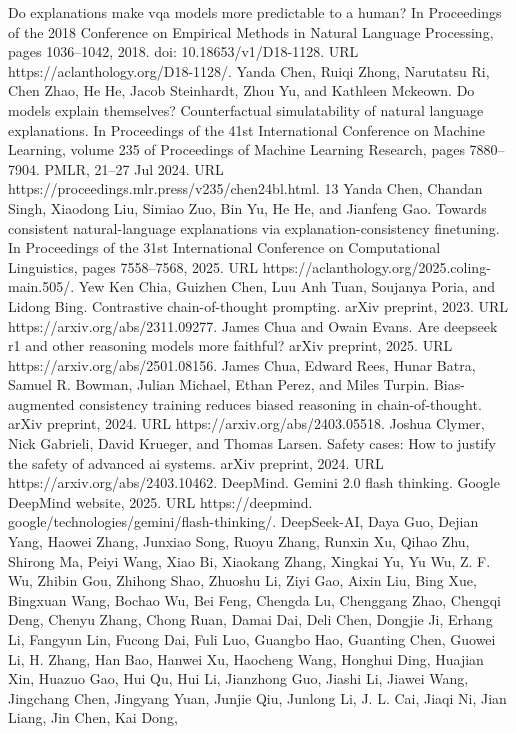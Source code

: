 Do explanations make vqa models more predictable to a human? In Proceedings of the 2018
Conference on Empirical Methods in Natural Language Processing, pages 1036–1042, 2018. doi:
10.18653/v1/D18-1128. URL https://aclanthology.org/D18-1128/.
Yanda Chen, Ruiqi Zhong, Narutatsu Ri, Chen Zhao, He He, Jacob Steinhardt, Zhou Yu, and Kathleen
Mckeown. Do models explain themselves? Counterfactual simulatability of natural language
explanations. In Proceedings of the 41st International Conference on Machine Learning, volume
235 of Proceedings of Machine Learning Research, pages 7880–7904. PMLR, 21–27 Jul 2024.
URL https://proceedings.mlr.press/v235/chen24bl.html.
13
Yanda Chen, Chandan Singh, Xiaodong Liu, Simiao Zuo, Bin Yu, He He, and Jianfeng Gao. Towards
consistent natural-language explanations via explanation-consistency finetuning. In Proceedings
of the 31st International Conference on Computational Linguistics, pages 7558–7568, 2025. URL
https://aclanthology.org/2025.coling-main.505/.
Yew Ken Chia, Guizhen Chen, Luu Anh Tuan, Soujanya Poria, and Lidong Bing. Contrastive
chain-of-thought prompting. arXiv preprint, 2023. URL https://arxiv.org/abs/2311.09277.
James Chua and Owain Evans. Are deepseek r1 and other reasoning models more faithful? arXiv
preprint, 2025. URL https://arxiv.org/abs/2501.08156.
James Chua, Edward Rees, Hunar Batra, Samuel R. Bowman, Julian Michael, Ethan Perez, and Miles
Turpin. Bias-augmented consistency training reduces biased reasoning in chain-of-thought. arXiv
preprint, 2024. URL https://arxiv.org/abs/2403.05518.
Joshua Clymer, Nick Gabrieli, David Krueger, and Thomas Larsen. Safety cases: How to justify the
safety of advanced ai systems. arXiv preprint, 2024. URL https://arxiv.org/abs/2403.10462.
DeepMind. Gemini 2.0 flash thinking. Google DeepMind website, 2025. URL https://deepmind.
google/technologies/gemini/flash-thinking/.
DeepSeek-AI, Daya Guo, Dejian Yang, Haowei Zhang, Junxiao Song, Ruoyu Zhang, Runxin Xu,
Qihao Zhu, Shirong Ma, Peiyi Wang, Xiao Bi, Xiaokang Zhang, Xingkai Yu, Yu Wu, Z. F. Wu,
Zhibin Gou, Zhihong Shao, Zhuoshu Li, Ziyi Gao, Aixin Liu, Bing Xue, Bingxuan Wang, Bochao
Wu, Bei Feng, Chengda Lu, Chenggang Zhao, Chengqi Deng, Chenyu Zhang, Chong Ruan,
Damai Dai, Deli Chen, Dongjie Ji, Erhang Li, Fangyun Lin, Fucong Dai, Fuli Luo, Guangbo Hao,
Guanting Chen, Guowei Li, H. Zhang, Han Bao, Hanwei Xu, Haocheng Wang, Honghui Ding,
Huajian Xin, Huazuo Gao, Hui Qu, Hui Li, Jianzhong Guo, Jiashi Li, Jiawei Wang, Jingchang
Chen, Jingyang Yuan, Junjie Qiu, Junlong Li, J. L. Cai, Jiaqi Ni, Jian Liang, Jin Chen, Kai Dong,
